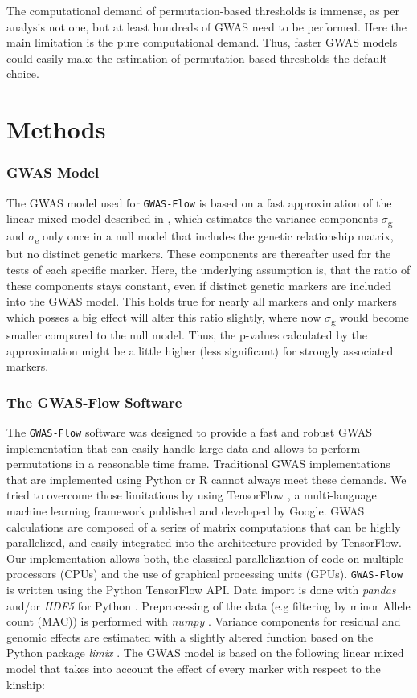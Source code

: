 The computational demand of permutation-based thresholds is immense, as per analysis not one, but at least hundreds of GWAS need to be performed. Here the main limitation is the pure computational demand. Thus, faster GWAS models could easily make the estimation of permutation-based thresholds the default choice.

\section{Methods}

\subsubsection{GWAS Model}
The GWAS model used for \texttt{GWAS-Flow} is based on a fast approximation of the linear-mixed-model described in \cite{kang2010variance,Zhang2010}, which estimates the variance components $\sigma$\textsubscript{g} and $\sigma$\textsubscript{e} only once in a null model that includes the genetic relationship matrix, but no distinct genetic markers. These components are thereafter used for the tests of each specific marker. Here, the underlying assumption is, that the ratio of these components stays constant, even if distinct genetic markers are included into the GWAS model. This holds true for nearly all markers and only markers which posses a big effect will alter this ratio slightly, where now $\sigma$\textsubscript{g} would become smaller compared to the null model. Thus, the p-values calculated by the approximation might be a little higher (less significant) for strongly associated markers. 

\subsubsection{The GWAS-Flow Software}
The \texttt{GWAS-Flow} software was designed to provide a fast and robust GWAS implementation that can easily handle large data and allows to perform permutations in a reasonable time frame. Traditional GWAS implementations that are implemented using Python \cite{van1995python} or R \cite{R} cannot always meet these demands.
We tried to overcome those limitations by using TensorFlow \cite{tensorflow2015-whitepaper}, a multi-language machine learning framework published and developed by Google. GWAS calculations are composed of a series of matrix computations that can be highly parallelized, and easily integrated into the architecture provided by TensorFlow. Our implementation allows both, the classical parallelization of code on multiple processors (CPUs) and the use of graphical processing units (GPUs). \texttt{GWAS-Flow} is written using the Python TensorFlow API. 
Data import is done with \textit{pandas} \cite{mckinney-proc-scipy-2010} and/or \textit{HDF5} for Python \cite{hdf5_2014}. Preprocessing of the data (e.g filtering by minor Allele count (MAC)) is performed with \textit{numpy} \cite{oliphant2006guide}. Variance components for residual and genomic effects are estimated with a slightly altered function based on the Python package \textit{limix} \cite{Lippert003905}. 
The GWAS model is based on the following linear mixed model that takes into account the effect of every marker with respect to the kinship:

